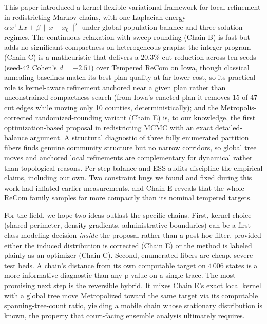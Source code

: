 \documentclass[11pt]{article}
\begin{document}
This paper introduced a kernel-flexible variational framework for
local refinement in redistricting Markov chains, with one Laplacian energy
$\alpha\,x^\top L x + \beta\,\|x - x_0\|^2$ under global population
balance and three solution regimes. The continuous relaxation with sweep
rounding (Chain B) is fast but adds no significant compactness on
heterogeneous graphs; the integer program (Chain C) is a matheuristic
that delivers a $20.3\%$ cut reduction across ten seeds (seed-42
Cohen's $d = -2.51$) over
Tempered ReCom on Iowa, though classical annealing baselines match
its best plan quality at far lower cost, so its practical role is
kernel-aware refinement anchored near a given plan rather than
unconstrained compactness search (from Iowa's enacted plan it
removes 15 of 47 cut edges while moving only 10 counties,
deterministically); and the Metropolis-corrected
randomized-rounding variant (Chain E) is, to our knowledge, the
first optimization-based proposal in redistricting MCMC with an
exact detailed-balance argument. A
structural diagnostic of three fully enumerated partition fibers
finds genuine community structure but no narrow corridors, so global
tree moves and anchored local refinements are complementary for
dynamical rather than topological reasons.
Per-step balance and ESS audits discipline the empirical claims,
including our own. Two constraint bugs we found and fixed
during this work had inflated earlier measurements, and Chain E
reveals that the whole ReCom family samples far more compactly than
its nominal tempered targets.

For the field, we hope two ideas outlast the specific chains. First,
kernel choice (shared perimeter, density gradients, administrative
boundaries) can be a first-class modeling decision \emph{inside}
the proposal rather than a post-hoc filter, provided either the induced
distribution is corrected (Chain E) or the method is labeled plainly
as an optimizer (Chain C). Second, enumerated fibers are cheap,
severe test beds. A chain's distance from its own computable target
on 4\,006 states is a more informative diagnostic than any p-value on
a single trace. The most promising next step is the reversible
hybrid. It mixes Chain E's exact local kernel with a global tree move
Metropolized toward the same target via its computable
spanning-tree-count ratio, yielding a mobile chain whose stationary
distribution is known, the property that court-facing ensemble
analysis ultimately requires.

\appendix
\end{document}
